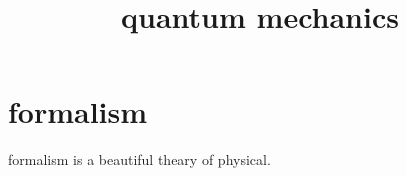 \documentclass{article}
\begin{document}
\title{quantum mechanics}
\section{formalism}
formalism is a beautiful theary of physical.
\end{document}
